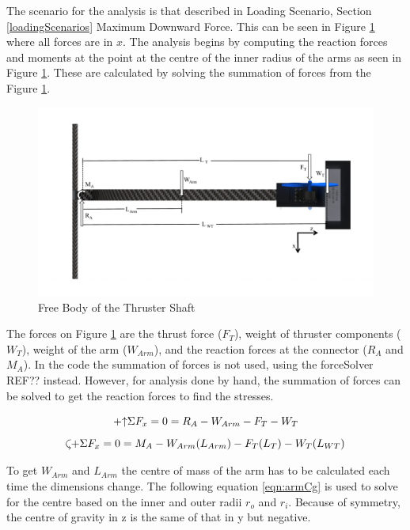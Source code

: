 \documentclass[../main.tex]{subfiles}
\begin{document}
The scenario for the analysis is that described in Loading Scenario, Section \ref{loadingScenarios} Maximum Downward Force. This can be seen in Figure \ref{fig:thrusterArmFBD} where all forces are in $x$. The analysis begins by computing the reaction forces and moments at the point at the centre of the inner radius of the arms as seen in Figure \ref{fig:thrusterArmFBD}. These are calculated by solving the summation of forces from the Figure \ref{fig:thrusterArmFBD}.

\begin{figure}[H]
	\centering
	\includegraphics[width=.9\linewidth]{img/analysis/arm/thrusterArm.pdf}
	\caption{Free Body of the Thruster Shaft}
	\label{fig:thrusterArmFBD}
\end{figure}

The forces on Figure \ref{fig:thrusterArmFBD} are the thrust force ($F_T$), weight of thruster components ($W_T$), weight of the arm ($W_{Arm}$), and the reaction forces at the connector ($R_A$ and $M_A$). In the code the summation of forces is not used, using the forceSolver REF?? instead. However, for analysis done by hand, the summation of forces can be solved to get the reaction forces to find the stresses.

\begin{equation} \label{eqn:armFx}
\mathbin{+\mathord\uparrow} \Sigma F_x = 0 = R_A - W_{Arm} - F_T - W_T
\end{equation}
\begin{equation} \label{eqn:armMA}
\curveplus \Sigma F_x = 0 = M_A - W_{Arm}(L_{Arm}) - F_T(L_T) - W_T(L_{WT})
\end{equation}

To get $W_{Arm}$ and $L_{Arm}$ the centre of mass of the arm has to be calculated each time the dimensions change. The following equation \ref{eqn:armCg} is used to solve for the centre based on the inner and outer radii $r_o$ and $r_i$. Because of symmetry, the centre of gravity in z is the same of that in y but negative. 
\end{document}
